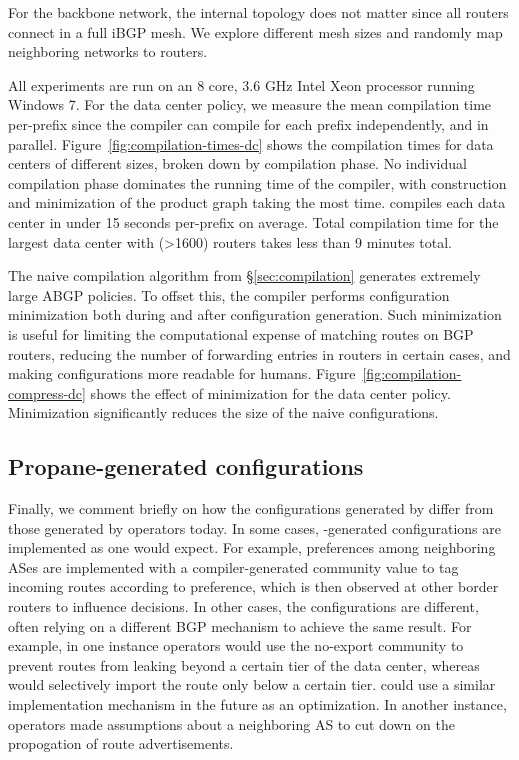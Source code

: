 For the backbone network, the internal topology does not matter since all routers connect in a full iBGP mesh. We explore different mesh sizes and randomly map neighboring networks to routers.

All experiments are run on an 8 core, 3.6 GHz Intel Xeon processor running Windows 7. 
%
For the data center policy, we measure the mean compilation time per-prefix since the \sysname compiler can compile for each prefix independently, and in parallel. Figure~\ref{fig:compilation-times-dc} shows the compilation times for data centers of different sizes, broken down by compilation phase. No individual compilation phase dominates the running time of the compiler, with construction and minimization of the product graph taking the most time. \sysname compiles each data center in under 15 seconds per-prefix on average. Total compilation time for the largest data center with (>1600) routers takes less than 9 minutes total.

The naive compilation algorithm from \S\ref{sec:compilation} generates extremely large ABGP policies. To offset this, the compiler performs configuration minimization both during and after configuration generation. Such minimization is useful for limiting the computational expense of matching routes on BGP routers, reducing the number of forwarding entries in routers in certain cases, and making configurations more readable for humans. Figure~\ref{fig:compilation-compress-dc} shows the effect of minimization for the data center policy. Minimization significantly reduces the size of the naive configurations.


\subsection{Propane-generated configurations}

Finally, we comment briefly on how the configurations generated by \sysname differ from those generated by operators today. In some cases, \sysname-generated configurations are implemented as one would expect. For example, preferences among neighboring ASes are implemented with a compiler-generated community value to tag incoming routes according to preference, which is then observed at other border routers to influence decisions. In other cases, the \sysname configurations are different, often relying on a different BGP mechanism to achieve the same result. For example, in one instance operators would use the no-export community to prevent routes from leaking beyond a certain tier of the data center, whereas \sysname would selectively import the route only below a certain tier. \sysname could use a similar implementation mechanism in the future as an optimization. In another instance, operators made assumptions about a neighboring AS to cut down on the propogation of route advertisements.



